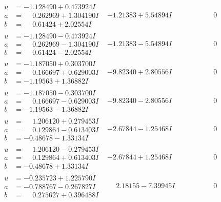 \documentclass[1p]{elsarticle_modified}
\theoremstyle{definition}
\begin{document}
$$\begin{array}{c|c|c}
\begin{aligned}
u &= -1.128490 + 0.473924 I \\
a &= \phantom{-}0.262969 + 1.304190 I \\
b &= \phantom{-}0.61424 + 2.02554 I\end{aligned}
 & -1.21383 + 5.54894 I & \phantom{-0.000000 } 0 \\ \hline\begin{aligned}
u &= -1.128490 - 0.473924 I \\
a &= \phantom{-}0.262969 - 1.304190 I \\
b &= \phantom{-}0.61424 - 2.02554 I\end{aligned}
 & -1.21383 - 5.54894 I & \phantom{-0.000000 } 0 \\ \hline\begin{aligned}
u &= -1.187050 + 0.303700 I \\
a &= \phantom{-}0.166697 + 0.629003 I \\
b &= -1.19563 + 1.36882 I\end{aligned}
 & -9.82340 + 2.80556 I & \phantom{-0.000000 } 0 \\ \hline\begin{aligned}
u &= -1.187050 - 0.303700 I \\
a &= \phantom{-}0.166697 - 0.629003 I \\
b &= -1.19563 - 1.36882 I\end{aligned}
 & -9.82340 - 2.80556 I & \phantom{-0.000000 } 0 \\ \hline\begin{aligned}
u &= \phantom{-}1.206120 + 0.279453 I \\
a &= \phantom{-}0.129864 - 0.613403 I \\
b &= -0.48678 - 1.33134 I\end{aligned}
 & -2.67844 - 1.25468 I & \phantom{-0.000000 } 0 \\ \hline\begin{aligned}
u &= \phantom{-}1.206120 - 0.279453 I \\
a &= \phantom{-}0.129864 + 0.613403 I \\
b &= -0.48678 + 1.33134 I\end{aligned}
 & -2.67844 + 1.25468 I & \phantom{-0.000000 } 0 \\ \hline\begin{aligned}
u &= -0.235723 + 1.225790 I \\
a &= -0.788767 - 0.267827 I \\
b &= \phantom{-}0.275627 + 0.396488 I\end{aligned}
 & \phantom{-}2.18155 - 7.39945 I & \phantom{-0.000000 } 0 \\ \hline\begin{aligned}

\end{aligned}
\end{array}$$
\end{document}
